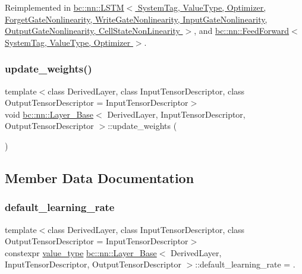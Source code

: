 Reimplemented in \hyperlink{structbc_1_1nn_1_1LSTM_a772315b1deeaa862a59437d4a1ccf9a8}{bc\+::nn\+::\+L\+S\+T\+M$<$ System\+Tag, Value\+Type, Optimizer, Forget\+Gate\+Nonlinearity, Write\+Gate\+Nonlinearity, Input\+Gate\+Nonlinearity, Output\+Gate\+Nonlinearity, Cell\+State\+Non\+Linearity $>$}, and \hyperlink{structbc_1_1nn_1_1FeedForward_a9a3f78006d1796787166bd1bc278b13f}{bc\+::nn\+::\+Feed\+Forward$<$ System\+Tag, Value\+Type, Optimizer $>$}.

\mbox{\label{structbc_1_1nn_1_1Layer__Base_a301f77da633513064795475c390a07e7}} 
\subsubsection{\texorpdfstring{update\+\_\+weights()}{update\_weights()}}
{\footnotesize\ttfamily template$<$class Derived\+Layer, class Input\+Tensor\+Descriptor, class Output\+Tensor\+Descriptor = Input\+Tensor\+Descriptor$>$ \\
void \hyperlink{structbc_1_1nn_1_1Layer__Base}{bc\+::nn\+::\+Layer\+\_\+\+Base}$<$ Derived\+Layer, Input\+Tensor\+Descriptor, Output\+Tensor\+Descriptor $>$\+::update\+\_\+weights (\begin{DoxyParamCaption}{ }\end{DoxyParamCaption})\hspace{0.3cm}{\ttfamily [inline]}}



\subsection{Member Data Documentation}
\mbox{\label{structbc_1_1nn_1_1Layer__Base_ac881324fe78f193bad68502be3640aa7}} 
\subsubsection{\texorpdfstring{default\+\_\+learning\+\_\+rate}{default\_learning\_rate}}
{\footnotesize\ttfamily template$<$class Derived\+Layer, class Input\+Tensor\+Descriptor, class Output\+Tensor\+Descriptor = Input\+Tensor\+Descriptor$>$ \\
constexpr \hyperlink{structbc_1_1nn_1_1Layer__Base_a64df0ea9c50a4d6dcf59483cc797c393}{value\+\_\+type} \hyperlink{structbc_1_1nn_1_1Layer__Base}{bc\+::nn\+::\+Layer\+\_\+\+Base}$<$ Derived\+Layer, Input\+Tensor\+Descriptor, Output\+Tensor\+Descriptor $>$\+::default\+\_\+learning\+\_\+rate = .\hspace{0.3cm}{\ttfamily [static]}}

